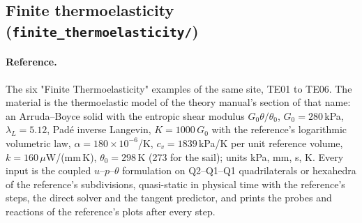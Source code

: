 \documentclass[11pt]{article}
\begin{document}
\subsection{Finite thermoelasticity (\texttt{finite\_thermoelasticity/})}
\label{sec:anandthermo}

\paragraph{Reference.}
The six "Finite Thermoelasticity" examples of the same site, TE01 to TE06.
The material is the thermoelastic model of the theory manual's section of
that name: an Arruda--Boyce solid with the entropic shear modulus
$G_0\theta/\theta_0$, $G_0 = 280$\,kPa, $\lambda_L = 5.12$, Pad\'e inverse
Langevin, $K = 1000\,G_0$ with the reference's logarithmic volumetric law,
$\alpha = 180\times10^{-6}$/K, $c_v = 1839$\,kPa/K per unit reference volume,
$k = 160$\,$\mu$W/(mm\,K), $\theta_0 = 298$\,K (273 for the sail); units
kPa, mm, s, K.  Every input is the coupled $u$--$p$--$\theta$ formulation on
Q2--Q1--Q1 quadrilaterals or hexahedra of the reference's subdivisions,
quasi-static in physical time with the reference's steps, the direct solver
and the tangent predictor, and prints the probes and reactions of the
reference's plots after every step.
\end{document}
